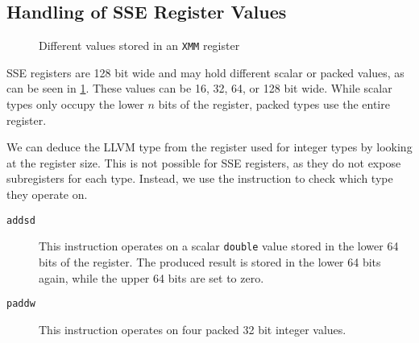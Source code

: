 \subsection{Handling of SSE Register Values}\label{subsec:handling-of-sse-register-values}

\begin{figure}[htpb]
    \centering
    \caption{Different values stored in an \texttt{XMM} register}
    \label{fig:xmm-regs}
\end{figure}

SSE registers are 128 bit wide and may hold different scalar or packed values, as can be seen in \cref{fig:xmm-regs}.
These values can be 16, 32, 64, or 128 bit wide.
While scalar types only occupy the lower $n$ bits of the register, packed types use the entire register.

We can deduce the LLVM type from the register used for integer types by looking at the register size.
This is not possible for SSE registers, as they do not expose subregisters for each type.
Instead, we use the instruction to check which type they operate on.

\begin{description}
    \item[\texttt{addsd}] This instruction operates on a scalar \texttt{double} value stored in the lower 64 bits of the register.
    The produced result is stored in the lower 64 bits again, while the upper 64 bits are set to zero.
    \item[\texttt{paddw}] This instruction operates on four packed 32 bit integer values.
\end{description}

